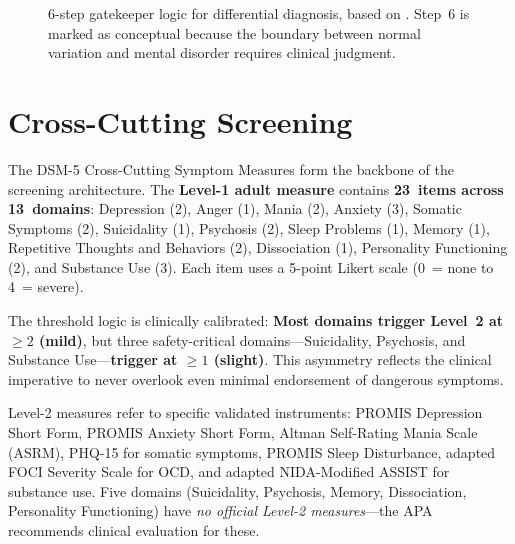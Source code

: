 \documentclass[11pt,a4paper]{article}
\begin{document}
\begin{figure}[ht]
\caption{6-step gatekeeper logic for differential diagnosis, based on \citet{First2024}. Step~6 is marked as conceptual because the boundary between normal variation and mental disorder requires clinical judgment.}
\label{fig:gatekeeper}
\end{figure}

\section{Cross-Cutting Screening}
\label{sec:screening}

The DSM-5 Cross-Cutting Symptom Measures form the backbone of the screening architecture. The \textbf{Level-1 adult measure} contains \textbf{23~items across 13~domains}: Depression (2), Anger (1), Mania (2), Anxiety (3), Somatic Symptoms (2), Suicidality (1), Psychosis (2), Sleep Problems (1), Memory (1), Repetitive Thoughts and Behaviors (2), Dissociation (1), Personality Functioning (2), and Substance Use (3). Each item uses a 5-point Likert scale (0~= none to 4~= severe).

The threshold logic is clinically calibrated: \textbf{Most domains trigger Level~2 at $\geq 2$ (mild)}, but three safety-critical domains---Suicidality, Psychosis, and Substance Use---\textbf{trigger at $\geq 1$ (slight)}. This asymmetry reflects the clinical imperative to never overlook even minimal endorsement of dangerous symptoms.

Level-2 measures refer to specific validated instruments: PROMIS Depression Short Form, PROMIS Anxiety Short Form, Altman Self-Rating Mania Scale (ASRM), PHQ-15 for somatic symptoms, PROMIS Sleep Disturbance, adapted FOCI Severity Scale for OCD, and adapted NIDA-Modified ASSIST for substance use. Five domains (Suicidality, Psychosis, Memory, Dissociation, Personality Functioning) have \textit{no official Level-2 measures}---the APA recommends clinical evaluation for these.
\end{document}
